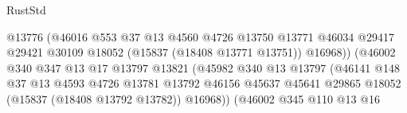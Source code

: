 \begin{lexlean}{RustStd}
\begin{coremodule}
{\begin{coremodule}
{{{{{{{{{{{{{{{{{{{{{{{{{{{{{{{{{{{{{{{{{{{{{{{{{{{{{{{{{{{{                                              @13776
                                              (@46016
                                                @553
                                                @37
                                                @13
                                                @4560
                                                @4726
                                                @13750
                                                @13771
                                                @46034
                                                @29417
                                                @29421
                                                @30109
                                                @18052
                                                (@15837 (@18408 @13771 @13751))
                                                @16968))
                                            (@46002
                                              @340
                                              @347
                                              @13
                                              @17
                                              @13797
                                              @13821
                                              (@45982
                                                @340
                                                @13
                                                @13797
                                                (@46141
                                                  @148
                                                  @37
                                                  @13
                                                  @4593
                                                  @4726
                                                  @13781
                                                  @13792
                                                  @46156
                                                  @45637
                                                  @45641
                                                  @29865
                                                  @18052
                                                  (@15837 (@18408 @13792 @13782))
                                                  @16968))
                                              (@46002
                                                @345
                                                @110
                                                @13
                                                @16
}}}}}}}}}}}}}}}}}}}}}}}}}}}}}}}}}}}}}}}}}}}}}}}}}}}}}}}}}}}}
\end{coremodule}}
\end{coremodule}
\end{lexlean}
